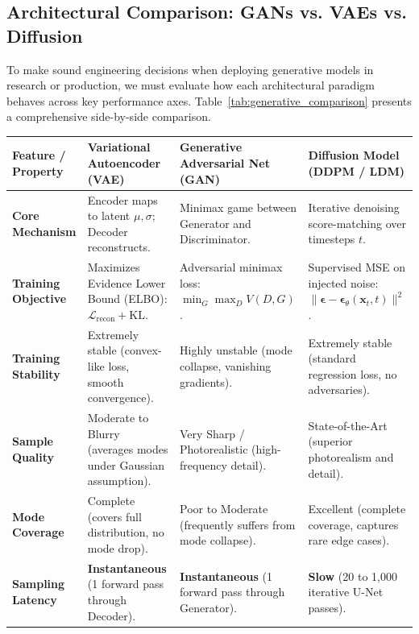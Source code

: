 \subsection{Architectural Comparison: GANs vs. VAEs vs. Diffusion}\label{subsec:model_comparison}

To make sound engineering decisions when deploying generative models in research or production, we must evaluate how each architectural paradigm behaves across key performance axes. Table~\ref{tab:generative_comparison} presents a comprehensive side-by-side comparison.

\begin{table}[htbp]
\centering
\small
\renewcommand{\arraystretch}{1.25}
\begin{tabular}{p{2.8cm} p{3.8cm} p{3.8cm} p{3.8cm}}
\toprule
\textbf{Feature / Property} & \textbf{Variational Autoencoder (VAE)} & \textbf{Generative Adversarial Net (GAN)} & \textbf{Diffusion Model (DDPM / LDM)} \\
\midrule
\textbf{Core Mechanism} & Encoder maps to latent $\mu, \sigma$; Decoder reconstructs. & Minimax game between Generator and Discriminator. & Iterative denoising score-matching over timesteps $t$. \\
\textbf{Training Objective} & Maximizes Evidence Lower Bound (ELBO): $\mathcal{L}_{\text{recon}} + \text{KL}$. & Adversarial minimax loss: $\min_G \max_D V(D, G)$. & Supervised MSE on injected noise: $\|\boldsymbol{\epsilon} - \boldsymbol{\epsilon}_\theta(\mathbf{x}_t, t)\|^2$. \\
\textbf{Training Stability} & Extremely stable (convex-like loss, smooth convergence). & Highly unstable (mode collapse, vanishing gradients). & Extremely stable (standard regression loss, no adversaries). \\
\textbf{Sample Quality} & Moderate to Blurry (averages modes under Gaussian assumption). & Very Sharp / Photorealistic (high-frequency detail). & State-of-the-Art (superior photorealism and detail). \\
\textbf{Mode Coverage} & Complete (covers full distribution, no mode drop). & Poor to Moderate (frequently suffers from mode collapse). & Excellent (complete coverage, captures rare edge cases). \\
\textbf{Sampling Latency} & \textbf{Instantaneous} (1 forward pass through Decoder). & \textbf{Instantaneous} (1 forward pass through Generator). & \textbf{Slow} (20 to 1,000 iterative U-Net passes). \\

\end{tabular}
\end{table}
